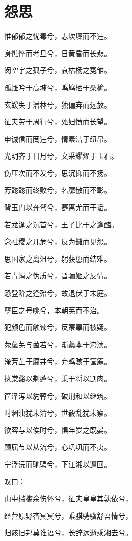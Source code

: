 \documentclass[UTF8,titlepage,oneside]{ctexbook}
\begin{document}
\section*{怨思}
\begin{center}
	
	惟郁郁之忧毒兮，志坎壈而不违。
	
	身憔悴而考旦兮，日黄昏而长悲。
	
	闵空宇之孤子兮，哀枯杨之冤雏。
	
	孤雌吟于高墉兮，鸣鸠栖于桑榆。
	
	玄蝯失于潜林兮，独偏弃而远放。
	
	征夫劳于周行兮，处妇愤而长望。
	
	申诚信而罔违兮，情素洁于纽帛。
	
	光明齐于日月兮，文采耀燿于玉石。
	
	伤压次而不发兮，思沉抑而不扬。
	
	芳懿懿而终败兮，名靡散而不彰。
	
	背玉门以奔骛兮，蹇离尤而干诟。
	
	若龙逢之沉首兮，王子比干之逢醢。
	
	念社稷之几危兮，反为雠而见怨。
	
	思国家之离沮兮，躬获愆而结难。
	
	若青蝇之伪质兮，晋骊姬之反情。
	
	恐登阶之逢殆兮，故退伏于末庭。
	
	孽臣之号咷兮，本朝芜而不治。
	
	犯颜色而触谏兮，反蒙辜而被疑。
	
	菀蘼芜与菌若兮，渐藁本于洿渎。
	
	淹芳芷于腐井兮，弃鸡骇于筐簏。
	
	执棠谿以刜蓬兮，秉干将以割肉。
	
	筐泽泻以豹鞟兮，破荆和以继筑。
	
	时溷浊犹未清兮，世殽乱犹未察。
	
	欲容与以俟时兮，惧年岁之既晏。
	
	顾屈节以从流兮，心巩巩而不夷。
	
	宁浮沅而驰骋兮，下江湘以邅回。
	
	叹曰：
	
	山中槛槛余伤怀兮，征夫皇皇其孰依兮，
	
	经营原野杳冥冥兮，乘骐骋骥舒吾情兮，
	
	归骸旧邦莫谁语兮，长辞远逝乘湘去兮。
	
	
\end{center}
\end{document}

